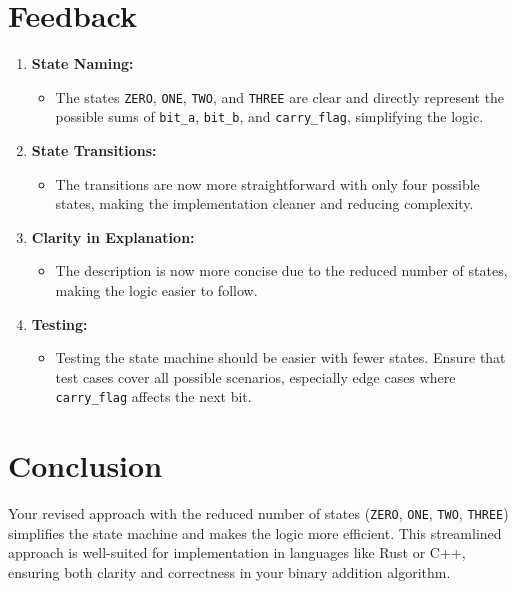 \documentclass{article}
\begin{document}
\section*{Feedback}

\begin{enumerate}[label=\arabic*.]
    \item \textbf{State Naming:}
    \begin{itemize}
        \item The states \texttt{ZERO}, \texttt{ONE}, \texttt{TWO}, and \texttt{THREE} are clear and directly represent the possible sums of \texttt{bit\_a}, \texttt{bit\_b}, and \texttt{carry\_flag}, simplifying the logic.
    \end{itemize}

    \item \textbf{State Transitions:}
    \begin{itemize}
        \item The transitions are now more straightforward with only four possible states, making the implementation cleaner and reducing complexity.
    \end{itemize}

    \item \textbf{Clarity in Explanation:}
    \begin{itemize}
        \item The description is now more concise due to the reduced number of states, making the logic easier to follow.
    \end{itemize}

    \item \textbf{Testing:}
    \begin{itemize}
        \item Testing the state machine should be easier with fewer states. Ensure that test cases cover all possible scenarios, especially edge cases where \texttt{carry\_flag} affects the next bit.
    \end{itemize}
\end{enumerate}

\section*{Conclusion}
Your revised approach with the reduced number of states (\texttt{ZERO}, \texttt{ONE}, \texttt{TWO}, \texttt{THREE}) simplifies the state machine and makes the logic more efficient. This streamlined approach is well-suited for implementation in languages like Rust or C++, ensuring both clarity and correctness in your binary addition algorithm.
\end{document}
